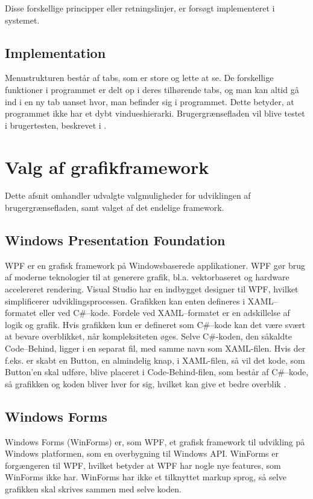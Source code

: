 Disse forskellige principper eller retningslinjer, er forsøgt implementeret i systemet.


\subsection{Implementation}\label{sec:Implementation}

Menustrukturen består af tabs, som er store og lette at se.
De forskellige funktioner i programmet er delt op i deres tilhørende tabs, og man kan altid gå ind i en ny tab uanset hvor, man befinder sig i programmet. 
Dette betyder, at programmet ikke har et dybt vindueshierarki.
Brugergrænsefladen vil blive testet i brugertesten, beskrevet i .

\section{Valg af grafikframework} 
Dette afsnit omhandler udvalgte valgmuligheder for udviklingen af brugergrænsefladen, samt valget af det endelige framework.

\subsection{Windows Presentation Foundation}
\ac{WPF} er en grafisk framework på Windowsbaserede applikationer. 
WPF gør brug af moderne teknologier til at generere grafik, bl.a. vektorbaseret og hardware accelereret rendering.
Visual Studio har en indbygget designer til WPF, hvilket simplificerer udviklingsprocessen. 
Grafikken kan enten defineres i \ac{XAML}--formatet eller ved C\#--kode. 
Fordele ved \ac{XAML}--formatet er en adskillelse af logik og grafik. 
Hvis grafikken kun er defineret som C\#--kode kan det være svært at bevare overblikket, når kompleksiteten øges.
Selve C\#-koden, den såkaldte Code--Behind, ligger i en separat fil, med samme navn som XAML-filen. 
Hvis der f.eks. er skabt en Button, en almindelig knap, i XAML-filen, så vil det kode, som Button'en skal udføre, blive placeret i Code-Behind-filen, som består af C\#--kode, så grafikken og koden bliver hver for sig, hvilket kan give et bedre overblik \citep{wpf}. 

\subsection{Windows Forms}
Windows Forms (WinForms) er, som \ac{WPF}, et grafisk framework til udvikling på Windows platformen, som en overbygning til Windows API.
WinForms er forgængeren til WPF, hvilket betyder at WPF har nogle nye features, som WinForms ikke har.
WinForms har ikke et tilknyttet markup sprog, så selve grafikken skal skrives sammen med selve koden. 
\citep{winforms2}

